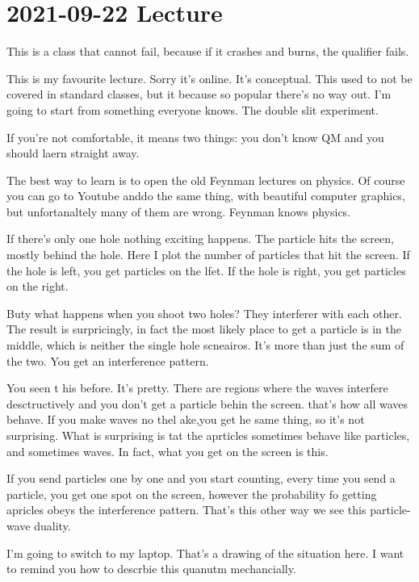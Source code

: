 \section{2021-09-22 Lecture}

This is a class that cannot fail,
because if it crashes and burns,
the qualifier fails.

This is my favourite lecture.
Sorry it's online.
It's conceptual.
This used to not be covered in standard classes,
but it because so popular there's no way out.
I'm going to start from something everyone knows.
The double slit experiment.

If you're not comfortable,
it means two things:
you don't know QM and you should laern straight away.

The best way to learn is to open the old Feynman lectures on physics.
Of course you can go to Youtube anddo the same thing,
with beautiful computer graphics,
but unfortanaltely many of them are wrong.
Feynman knows physics.


If there's only one hole nothing exciting happens.
The particle hits the screen,
mostly behind the hole.
Here I plot the number of particles that hit the screen.
If the hole is left,
you get particles on the lfet.
If the hole is right,
you get particles on the right.

Buty what happens when you shoot two holes?
They interferer with each other.
The result is surpricingly,
in fact the most likely place to get a particle is in the middle,
which is neither the single hole scneairos.
It's more than just the sum of the two.
You get an interference pattern.

You seen t his before.
It's pretty.
There are regions where the waves interfere desctructively and you don't get a
particle behin the screen.
that's how all waves behave.
If you make waves no thel ake,you get he same thing,
so it's not surprising.
What is surprising is tat the aprticles sometimes behave like particles,
and sometimes waves.
In fact,
what you get on the screen is this.

If you send particles one by one and you start counting,
every time you send a particle,
you get one spot on the screen,
however the probability fo getting apricles obeys the interference pattern.
That's this other way we see this particle-wave duality.

I'm going to switch to my laptop.
That's a drawing of the situation here.
I want to remind you how to descrbie this quanutm mechancially.


